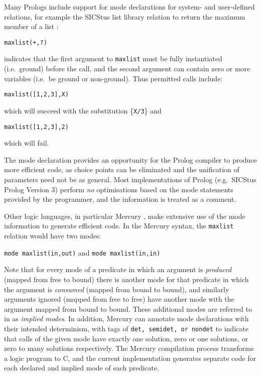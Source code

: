 Many Prologs include support for mode declarations for system- and user-defined relations,
for example the SICStus list library relation to return the maximum member of
a list \cite{BBP+94}:
\begin{center}\texttt{maxlist(+,?)}\end{center}
indicates that the first argument to \texttt{maxlist} must be fully
instantiated (i.e.\ ground) before the call,
and the second argument can contain zero or more variables
(i.e.\ be ground or non-ground).  Thus permitted calls include:
\begin{center}\texttt{maxlist([1,2,3],X)}\end{center}
which will succeed with the substitution \{\texttt{X/3}\} and
\begin{center}\texttt{maxlist([1,2,3],2)}\end{center}
which will fail.

The mode declaration provides an opportunity for the Prolog compiler to produce more efficient
code, as choice points can be eliminated and the unification of parameters need not be as
general.  Most implementations of Prolog (e.g.~SICStus Prolog Version 3) perform \textit{no}
optimisations based on the mode statements provided by the programmer, and the information is
treated as a comment.

Other logic languages, in particular Mercury \cite{SHC95}, make extensive use of the mode
information to generate efficient code.
In the Mercury syntax, the \texttt{maxlist} relation would have two modes:\\
\begin{center}\texttt{mode maxlist(in,out)} and \texttt{mode maxlist(in,in)}\end{center}
Note that for every mode of a predicate in which an argument is \textit{produced} (mapped
from free to bound) there is another mode for that predicate in which the argument is
\textit{consumed} (mapped from bound to bound), and similarly arguments ignored (mapped from
free to free) have another mode with the argument mapped from bound to bound.  These additional
modes are referred to in \cite{SHC95} as \textit{implied modes}.
In addition, Mercury can annotate mode declarations with their intended determinism, with tags of
\texttt{det, semidet, or nondet} to indicate that calls of the given mode have exactly one
solution, zero or one solutions, or zero to many solutions respectively.
The Mercury compilation process transforms a logic
program to C, and the current implementation generates separate code for each
declared and implied mode of each
predicate.

